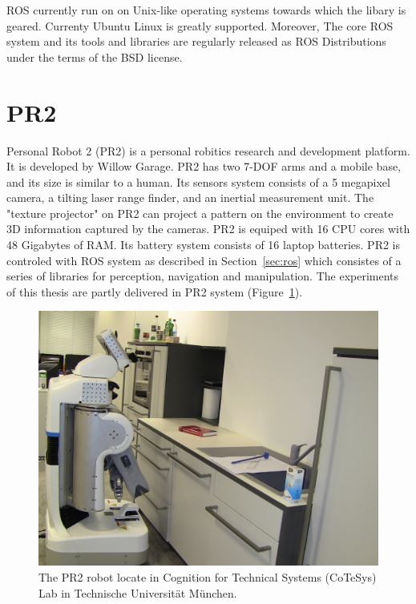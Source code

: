 ROS currently run on on Unix-like operating systems towards which the libary is
geared. Currenty Ubuntu Linux is greatly supported. Moreover, The core
ROS system and its tools and libraries are regularly released as ROS
Distributions~\cite{rosintroduction} under the terms of the BSD license.

\section{PR2}
\label{sec:pr2}
Personal Robot 2 (PR2) is a personal robitics research and development
platform.  It is developed by Willow Garage.  PR2 has two 7-DOF arms and a mobile
base, and its size  is similar to a human. Its sensors system consists of a 5
megapixel camera, a tilting laser range finder, and an inertial
measurement unit. The "texture projector" on PR2 can project a pattern
on the environment to create 3D information captured by the
cameras. PR2 is equiped with 16 CPU cores with 48 Gigabytes of
RAM. Its battery system consists of 16 laptop batteries. PR2 is
controled with ROS system as described in Section~\ref{sec:ros} which
consistes of a series of libraries for perception, navigation and
manipulation.
The experiments of this thesis are partly delivered in PR2 system (Figure~\ref{fig:pr2}).

\begin{figure}[htbp]
  \centering
\includegraphics[width=\linewidth]{images/pr2.png}
  \caption[A PR2 robot]{The PR2 robot locate in Cognition for
    Technical Systems (CoTeSys) Lab in Technische Universit\"at M\"unchen.}
  \label{fig:pr2}
\end{figure}

